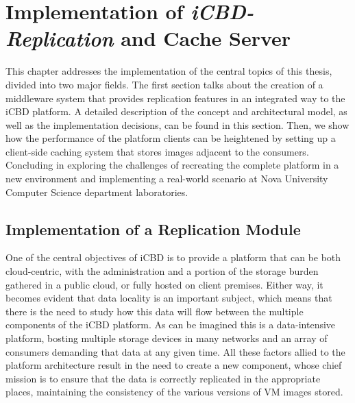 \chapter{Implementation of \textit{iCBD-Replication} and Cache Server}
\label{cha:replication}

This chapter addresses the implementation of the central topics of this thesis, divided into two major fields.
The first section talks about the creation of a middleware system that provides replication features in an integrated way to the iCBD platform. A detailed description of the concept and architectural model, as well as the implementation decisions, can be found in this section.
Then, we show how the performance of the platform clients can be heightened by setting up a client-side caching system that stores images adjacent to the consumers. Concluding in exploring the challenges of recreating the complete platform in a new environment and implementing a real-world scenario at Nova University Computer Science department laboratories.


\section{Implementation of a Replication Module}
\label{sec:replication_impl}

One of the central objectives of iCBD is to provide a platform that can be both cloud-centric, with the administration and a portion of the storage burden gathered in a public cloud, or fully hosted on client premises. Either way, it becomes evident that data locality is an important subject, which means that there is the need to study how this data will flow between the multiple components of the iCBD platform.
As can be imagined this is a data-intensive platform, bosting multiple storage devices in many networks and an array of consumers demanding that data at any given time.
All these factors allied to the platform architecture result in the need to create a new component, whose chief mission is to ensure that the data is correctly replicated in the appropriate places, maintaining the consistency of the various versions of VM images stored.

